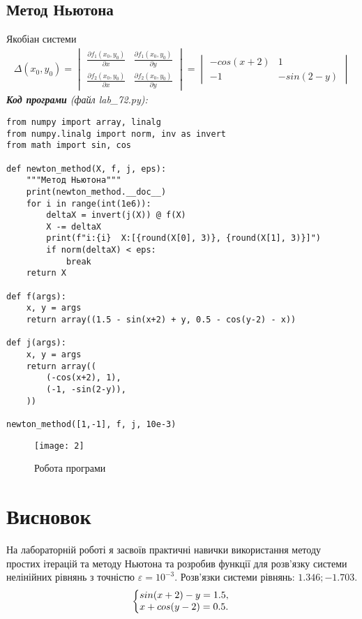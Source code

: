 \documentclass{article}
\newcommand\lab{7}
\begin{document}
\begin{large}
		\subsection*{Метод Ньютона}
		Якобіан системи
		\begin{gather}
			\varDelta(x_0, y_0)=
			\begin{vmatrix}
				\frac{\partial f_1(x_0, y_0)}{\partial x} & \frac{\partial f_1(x_0, y_0)}{\partial y}\\
				\frac{\partial f_2(x_0, y_0)}{\partial x} & \frac{\partial f_2(x_0, y_0)}{\partial y}
			\end{vmatrix}
			=
			\begin{vmatrix}
				-cos(x+2) & 1\\
				-1 & -sin(2-y)
			\end{vmatrix}
			\nonumber
		\end{gather}
		\noindent\textit{\textbf{Код програми} (файл lab\_\lab2.py):}
		\begin{lstlisting}
from numpy import array, linalg
from numpy.linalg import norm, inv as invert
from math import sin, cos

def newton_method(X, f, j, eps):
	"""Метод Ньютона"""
	print(newton_method.__doc__)
	for i in range(int(1e6)):
		deltaX = invert(j(X)) @ f(X)
		X -= deltaX 
		print(f"i:{i}  X:[{round(X[0], 3)}, {round(X[1], 3)}]")
		if norm(deltaX) < eps:
			break
	return X

def f(args):
	x, y = args
	return array((1.5 - sin(x+2) + y, 0.5 - cos(y-2) - x))

def j(args):
	x, y = args
	return array((
		(-cos(x+2), 1),
		(-1, -sin(2-y)),
	))

newton_method([1,-1], f, j, 10e-3)\end{lstlisting}
		
		\begin{figure}[H]
			\centering
			\texttt{[image: 2]}
			\caption{Робота програми}
		\end{figure}
		
		\section*{Висновок}
		На лабораторній роботі я засвоїв практичні навички використання методу простих ітерацій та методу Ньютона та розробив функції для розв’язку системи нелінійних рівнянь з точністю $\varepsilon=10^{-3}$.
		Розв'язки системи рівнянь: $1.346; -1.703$.
		\begin{gather}
			\left\{\begin{array}{@{}l@{}}
				sin(x+2)-y=1.5,\\\nonumber
				x+cos(y-2) = 0.5.\nonumber
			\end{array}\right.\,
		\end{gather}

	\end{large}
\end{document}
